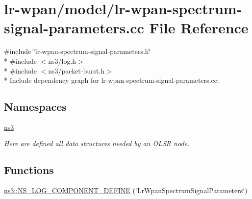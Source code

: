 \hypertarget{lr-wpan-spectrum-signal-parameters_8cc}{}\section{lr-\/wpan/model/lr-\/wpan-\/spectrum-\/signal-\/parameters.cc File Reference}
\label{lr-wpan-spectrum-signal-parameters_8cc}
{\ttfamily \#include \char`\"{}lr-\/wpan-\/spectrum-\/signal-\/parameters.\+h\char`\"{}}\\*
{\ttfamily \#include $<$ns3/log.\+h$>$}\\*
{\ttfamily \#include $<$ns3/packet-\/burst.\+h$>$}\\*
Include dependency graph for lr-\/wpan-\/spectrum-\/signal-\/parameters.cc\+:
\subsection*{Namespaces}
\begin{DoxyCompactItemize}
\item 
 \hyperlink{namespacens3}{ns3}
\begin{DoxyCompactList}\small\item\em Here are defined all data structures needed by an O\+L\+SR node. \end{DoxyCompactList}\end{DoxyCompactItemize}
\subsection*{Functions}
\begin{DoxyCompactItemize}
\item 
\hyperlink{namespacens3_af70564e22f02048dbd663cddb2253cd2}{ns3\+::\+N\+S\+\_\+\+L\+O\+G\+\_\+\+C\+O\+M\+P\+O\+N\+E\+N\+T\+\_\+\+D\+E\+F\+I\+NE} (\char`\"{}Lr\+Wpan\+Spectrum\+Signal\+Parameters\char`\"{})
\end{DoxyCompactItemize}

